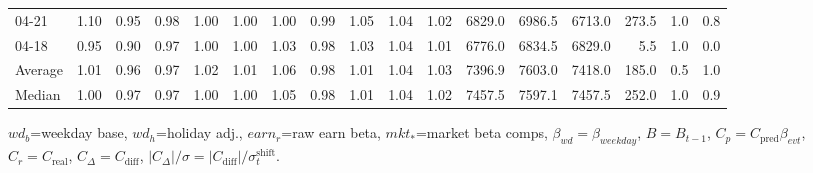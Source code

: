\begin{threeparttable}
{\begin{tabular}{lrrrrrrrrrrrrrrrr}
  04-21 &   1.10 &   0.95 &         0.98 &     1.00 &           1.00 &        1.00 &        0.99 &        1.05 &          1.04 &          1.02 & 6829.0 & 6986.5 & 6713.0 &      273.5 &                      1.0 &                 0.8 \\
  04-18 &   0.95 &   0.90 &         0.97 &     1.00 &           1.00 &        1.03 &        0.98 &        1.03 &          1.04 &          1.01 & 6776.0 & 6834.5 & 6829.0 &        5.5 &                      1.0 &                 0.0 \\
Average &   1.01 &   0.96 &         0.97 &     1.02 &           1.01 &        1.06 &        0.98 &        1.01 &          1.04 &          1.03 & 7396.9 & 7603.0 & 7418.0 &      185.0 &                      0.5 &                 1.0 \\
 Median &   1.00 &   0.97 &         0.97 &     1.00 &           1.00 &        1.05 &        0.98 &        1.01 &          1.04 &          1.02 & 7457.5 & 7597.1 & 7457.5 &      252.0 &                      1.0 &                 0.9 \\
\bottomrule
\end{tabular}
}
\begin{tablenotes}\footnotesize
\item $wd_b$=weekday base, $wd_h$=holiday adj.,
$earn_r$=raw earn beta, $mkt_{*}$=market beta comps,
$\beta_{wd}=\beta_{weekday}$, $B=B_{t-1}$,
$C_p=C_{\text{pred}}\beta_{evt}$, $C_r=C_{\text{real}}$,
$C_\Delta=C_{\text{diff}}$, $|C_\Delta|/\sigma=|C_{\text{diff}}|/\sigma_t^{\text{shift}}$.
\end{tablenotes}
\end{threeparttable}
\endgroup
